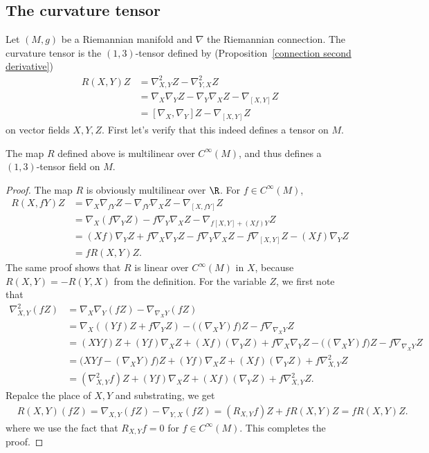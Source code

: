 \subsection{The curvature tensor}
Let $(M,g)$ be a Riemannian manifold and $\nabla$ the Riemannian connection. The curvature tensor is the $(1,3)$-tensor defined by (Proposition~\ref{connection second derivative})
\begin{align*}
R(X,Y)Z&=\nabla^2_{X,Y}Z-\nabla^2_{Y,X}Z\\
&=\nabla_X\nabla_YZ-\nabla_Y\nabla_XZ-\nabla_{[X,Y]}Z\\
&=[\nabla_X,\nabla_Y]Z-\nabla_{[X,Y]}Z
\end{align*}
on vector fields $X,Y,Z$. First let's verify that this indeed defines a tensor on $M$.
\begin{proposition}\label{Riemann curvature is tensor}
The map $R$ defined above is multilinear over $C^{\infty}(M)$, and thus defines a $(1,3)$-tensor field on $M$.
\end{proposition}
\begin{proof}
The map $R$ is obviously multilinear over $\R$. For $f\in C^{\infty}(M)$,
\begin{align*}
R(X,fY)Z&=\nabla_{X}\nabla_{fY}Z-\nabla_{fY}\nabla_{X}Z-\nabla_{[X,fY]}Z\\
&=\nabla_X(f\nabla_YZ)-f\nabla_Y\nabla_XZ-\nabla_{f[X,Y]+(Xf)Y}Z\\
&=(Xf)\nabla_YZ+f\nabla_X\nabla_YZ-f\nabla_Y\nabla_XZ-f\nabla_{[X,Y]}Z-(Xf)\nabla_{Y}Z\\
&=fR(X,Y)Z.
\end{align*}
The same proof shows that $R$ is linear over $C^\infty(M)$ in $X$, because $R(X,Y)=-R(Y,X)$ from the definition. For the variable $Z$, we first note that
\begin{align*}
\nabla^2_{X,Y}(fZ)&=\nabla_X\nabla_Y(fZ)-\nabla_{\nabla_XY}(fZ)\\
&=\nabla_X((Yf)Z+f\nabla_YZ)-\big((\nabla_XY)f\big)Z-f\nabla_{\nabla_XY}Z\\
&=(XYf)Z+(Yf)\nabla_XZ+(Xf)(\nabla_YZ)+f\nabla_{X}\nabla_YZ-\big((\nabla_XY)f\big)Z-f\nabla_{\nabla_XY}Z\\
&=\big(XYf-(\nabla_XY)f\big)Z+(Yf)\nabla_XZ+(Xf)(\nabla_YZ)+f\nabla_{X,Y}^2Z\\
&=(\nabla^2_{X,Y}f)Z+(Yf)\nabla_XZ+(Xf)(\nabla_YZ)+f\nabla_{X,Y}^2Z.
\end{align*}
Repalce the place of $X,Y$ and substrating, we get
\begin{align*}
&R(X,Y)(fZ)=\nabla_{X,Y}(fZ)-\nabla_{Y,X}(fZ)=(R_{X,Y}f)Z+fR(X,Y)Z=fR(X,Y)Z.
\end{align*}
where we use the fact that $R_{X,Y}f=0$ for $f\in C^\infty(M)$. This completes the proof.
\end{proof}
